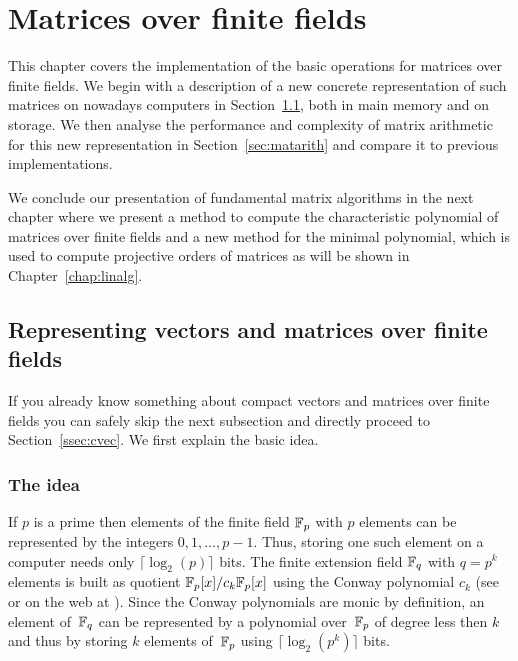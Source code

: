 
\chapter{Matrices over finite fields}

This chapter covers the implementation of the basic operations for matrices 
over finite fields. We begin with a description of a new concrete 
representation of such matrices on nowadays computers in 
Section~\ref{sec:ffematrices}, both in main memory and on storage.
We then analyse the performance and complexity of matrix arithmetic 
for this new representation in Section~\ref{sec:matarith} and compare
it to previous implementations. 

We conclude our presentation of fundamental matrix algorithms
in the next chapter where we present a method to compute the characteristic
polynomial of matrices over finite fields and a new method
for the minimal polynomial, which is used to compute projective orders
of matrices as will be shown in Chapter~\ref{chap:linalg}.


\section{Representing vectors and matrices over finite fields}
\label{sec:ffematrices}

If you already know something about compact vectors and matrices over 
finite fields you can safely skip the next subsection and directly
proceed to Section~\ref{ssec:cvec}. We first explain the basic idea.

\subsection{The idea}

If $p$ is a prime then elements of the finite field $\mathbb{F}_p$ with $p$
elements can be represented by the integers $0, 1, \ldots, p-1$. Thus,
storing one such element on a computer needs only $\lceil \log_2(p)
\rceil$ bits. The finite extension field  $\mathbb{F}_q$ with $q = p^k$ elements 
is built
as quotient $\mathbb{F}_p[x]/c_k \mathbb{F}_p[x]$ using the Conway polynomial
$c_k$ (see \cite{Nickel} or on the web at \cite{ConwayFL}). Since the
Conway polynomials are monic by definition, an element
of\, $\mathbb{F}_q$ can be represented by a polynomial over\, $\mathbb{F}_p$ of degree 
less then $k$ and thus by storing $k$ elements of\, $\mathbb{F}_p$ using $\lceil
\log_2(p^k) \rceil$ bits.

